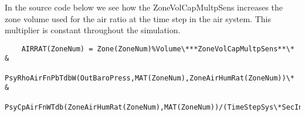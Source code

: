 In the source code below we see how the ZoneVolCapMultpSens increases the zone volume used for the air ratio at the time step in the air system. This multiplier is constant throughout the simulation.

\begin{lstlisting}
    AIRRAT(ZoneNum) = Zone(ZoneNum)%Volume\***ZoneVolCapMultpSens**\* &
               PsyRhoAirFnPbTdbW(OutBaroPress,MAT(ZoneNum),ZoneAirHumRat(ZoneNum))\* &
               PsyCpAirFnWTdb(ZoneAirHumRat(ZoneNum),MAT(ZoneNum))/(TimeStepSys\*SecInHour)
\end{lstlisting}
